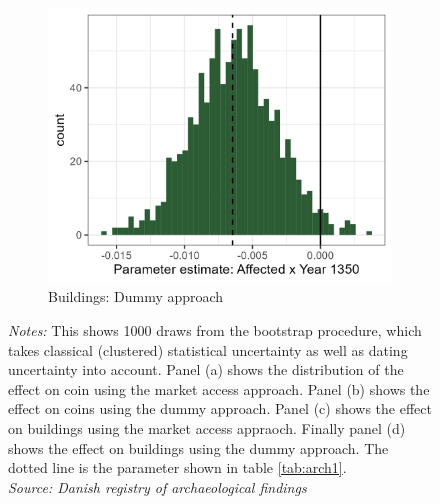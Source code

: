 \documentclass[11pt]{article}
\begin{document}
\begin{figure}
\begin{subfigure}[b]{0.45\textwidth}
        \centering
        \caption{Buildings: Dummy approach} \label{fig:distri_d}
        \includegraphics[width=\textwidth]{Plots/Regression_plots/arch_dummy_buildings_boot.png}
    \end{subfigure}
    \parbox{0.9\textwidth}{
    \caption*{\footnotesize \textit{Notes:} This shows 1000 draws from the bootstrap procedure, which takes classical (clustered) statistical uncertainty as well as dating uncertainty into account. Panel (a) shows the distribution of the effect on coin using the market access approach. Panel (b) shows the effect on coins using the dummy approach. Panel (c) shows the effect on buildings using the market access appraoch. Finally panel (d) shows the effect on buildings using the dummy approach. The dotted line is the parameter shown in table \ref{tab:arch1}. \\ \textit{Source: Danish registry of archaeological findings}}
}
    \label{fig:arch_reg_boot}
\end{figure}
\end{document}
